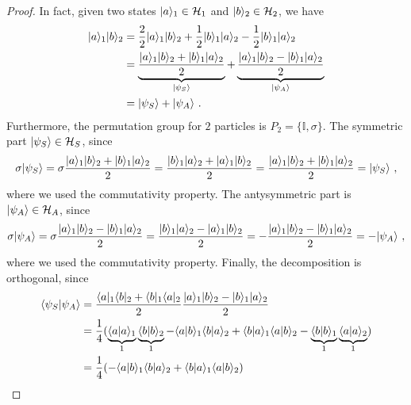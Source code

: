     \begin{proof}
        In fact, given two states $\vert a\rangle_1 \in \mathcal H_1$ and $\vert b\rangle_2 \in \mathcal H_2$, we have 
    \begin{equation*}
    \begin{aligned}
        \vert a\rangle_1\vert b\rangle_2 & = \frac{2}{2} \vert a\rangle_1\vert b\rangle_2 + \frac{1}{2} \vert b\rangle_1\vert a\rangle_2 - \frac{1}{2} \vert b\rangle_1\vert a\rangle_2 \\ & = \underbrace{\frac{\vert a\rangle_1\vert b\rangle_2 + \vert b\rangle_1\vert a\rangle_2}{2}}_{\vert\psi_S\rangle} + \underbrace{\frac{\vert a\rangle_1\vert b\rangle_2 - \vert b\rangle_1\vert a\rangle_2}{2}}_{\vert\psi_A\rangle} \\ & = \vert\psi_S\rangle + \vert\psi_A\rangle ~.
    \end{aligned}
    \end{equation*}
    Furthermore, the permutation group for $2$ particles is $P_2 = \{\mathbb I, \sigma\}$. The symmetric part $\vert\psi_S\rangle \in \mathcal H_S$, since
    \begin{equation*}
        \sigma \vert\psi_S\rangle = \sigma \frac{\vert a\rangle_1\vert b\rangle_2 + \vert b\rangle_1\vert a\rangle_2}{2} = \frac{\vert b\rangle_1\vert a\rangle_2 + \vert a\rangle_1\vert b\rangle_2}{2} = \frac{\vert a\rangle_1\vert b\rangle_2 + \vert b\rangle_1\vert a\rangle_2}{2} = \vert\psi_S\rangle ~,
    \end{equation*}
    where we used the commutativity property. The antysymmetric part is $\vert\psi_A\rangle \in \mathcal H_A$, since
    \begin{equation*}
        \sigma \vert\psi_A\rangle = \sigma \frac{\vert a\rangle_1\vert b\rangle_2 - \vert b\rangle_1\vert a\rangle_2}{2} = \frac{\vert b\rangle_1\vert a\rangle_2 - \vert a\rangle_1\vert b\rangle_2}{2} = - \frac{\vert a\rangle_1\vert b\rangle_2 - \vert b\rangle_1\vert a\rangle_2}{2} = - \vert\psi_A\rangle ~,
    \end{equation*}
    where we used the commutativity property. Finally, the decomposition is orthogonal, since 
    \begin{equation*}
    \begin{aligned}
        \langle\psi_S\vert\psi_A\rangle & = \frac{\langle a\vert_1\langle b\vert_2 + \langle b\vert_1\langle a\vert_2}{2} \frac{\vert a\rangle_1 \vert b\rangle_2 - \vert b\rangle_1 \vert a\rangle_2}{2} \\ & = \frac{1}{4} (\underbrace{\langle a\vert a\rangle_1}_1 \underbrace{\langle b\vert b\rangle_2}_1 - \langle a\vert b\rangle_1 \langle b\vert a\rangle_2 + \langle b\vert a\rangle_1 \langle a\vert b\rangle_2 - \underbrace{\langle b\vert b\rangle_1}_1 \underbrace{\langle a\vert a\rangle_2}_1) \\ & = \frac{1}{4} (- \langle a\vert b\rangle_1 \langle b\vert a\rangle_2 + \langle b\vert a\rangle_1 \langle a\vert b\rangle_2)  
    \end{aligned}
    \end{equation*}

\end{proof}
